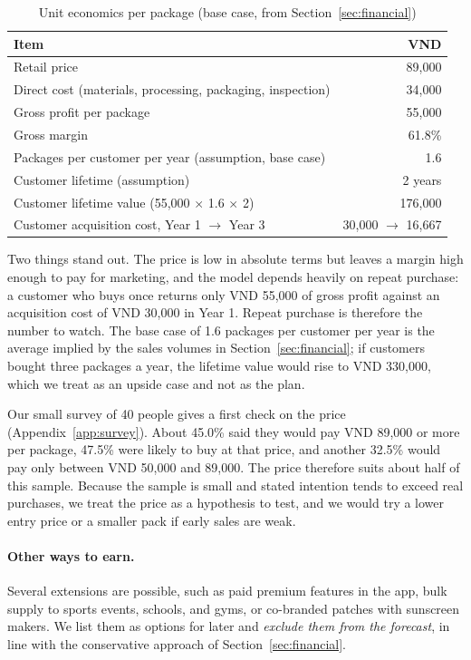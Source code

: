 \begin{table}[ht]
\centering\small
\caption{Unit economics per package (base case, from Section~\ref{sec:financial})}\label{tab:unit}
\begin{tabular}{@{}L{7.2cm}r@{}}
  \toprule
  \textbf{Item} & \textbf{VND}\\
  \midrule
  Retail price & 89,000\\
  Direct cost (materials, processing, packaging, inspection) & 34,000\\
  Gross profit per package & 55,000\\
  Gross margin & 61.8\%\\
  Packages per customer per year (assumption, base case) & 1.6\\
  Customer lifetime (assumption) & 2 years\\
  Customer lifetime value (55,000 $\times$ 1.6 $\times$ 2) & 176,000\\
  Customer acquisition cost, Year 1 $\to$ Year 3 & 30,000 $\to$ 16,667\\
  \bottomrule
\end{tabular}
\end{table}

Two things stand out. The price is low in absolute terms but leaves a margin high
enough to pay for marketing, and the model depends heavily on repeat purchase:
a customer who buys once returns only VND 55,000 of gross profit against an
acquisition cost of VND 30,000 in Year 1. Repeat purchase is therefore the number to
watch. The base case of 1.6 packages per customer per year is the average implied by the sales
volumes in Section~\ref{sec:financial}; if customers bought three packages a year, the lifetime
value would rise to VND 330,000, which we treat as an upside case and not as the plan.

Our small survey of 40 people gives a first check on the price (Appendix~\ref{app:survey}).
About 45.0\% said they would pay VND 89,000 or more per package, 47.5\% were likely to buy at
that price, and another 32.5\% would pay only between VND 50,000 and 89,000. The price
therefore suits about half of this sample. Because the sample is small and stated intention
tends to exceed real purchases, we treat the price as a hypothesis to test, and we would try a
lower entry price or a smaller pack if early sales are weak.

\paragraph{Other ways to earn.} Several extensions are possible, such as paid
premium features in the app, bulk supply to sports events, schools, and gyms, or
co-branded patches with sunscreen makers. We list them as options for later and
\emph{exclude them from the forecast}, in line with the conservative approach of
Section~\ref{sec:financial}.

